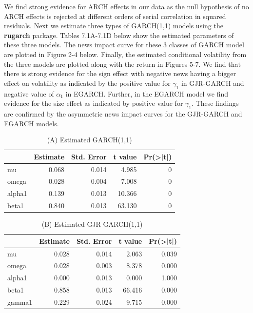 \documentclass[]{book}
\theoremstyle{definition}
\theoremstyle{definition}
\theoremstyle{definition}
\theoremstyle{remark}
\begin{document}
We find strong evidence for ARCH effects in our data as the null hypothesis of no ARCH effects is rejected at different orders of serial correlation in squared residuals. Next we estimate three types of GARCH(1,1) models using the \textbf{rugarch} package. Tables 7.1A-7.1D below show the estimated parameters of these three models. The news impact curve for these 3 classes of GARCH model are plotted in Figure 2-4 below. Finally, the estimated conditional volatility from the three models are plotted along with the return in Figures 5-7. We find that there is strong evidence for the sign effect with negative news having a bigger effect on volatility as indicated by the positive value for \(\gamma_1\) in GJR-GARCH and negative value of \(\alpha_1\) in EGARCH. Further, in the EGARCH model we find evidence for the size effect as indicated by positive value for \(\gamma_1\). These findings are confirmed by the asymmetric news impact curves for the GJR-GARCH and EGARCH models.

\begin{table}[t]

\caption{\label{tab:unnamed-chunk-11}(A) Estimated GARCH(1,1)}
\centering
\begin{tabular}{l|r|r|r|r}
\hline
  &  Estimate &  Std. Error &  t value & Pr(>|t|)\\
\hline
mu & 0.068 & 0.014 & 4.985 & 0\\
\hline
omega & 0.028 & 0.004 & 7.008 & 0\\
\hline
alpha1 & 0.139 & 0.013 & 10.366 & 0\\
\hline
beta1 & 0.840 & 0.013 & 63.130 & 0\\
\hline
\end{tabular}
\end{table}

\begin{table}[t]

\caption{\label{tab:unnamed-chunk-11}(B) Estimated GJR-GARCH(1,1)}
\centering
\begin{tabular}{l|r|r|r|r}
\hline
  &  Estimate &  Std. Error &  t value & Pr(>|t|)\\
\hline
mu & 0.028 & 0.014 & 2.063 & 0.039\\
\hline
omega & 0.028 & 0.003 & 8.378 & 0.000\\
\hline
alpha1 & 0.000 & 0.013 & 0.000 & 1.000\\
\hline
beta1 & 0.858 & 0.013 & 66.416 & 0.000\\
\hline
gamma1 & 0.229 & 0.024 & 9.715 & 0.000\\
\hline
\end{tabular}
\end{table}
\end{document}
